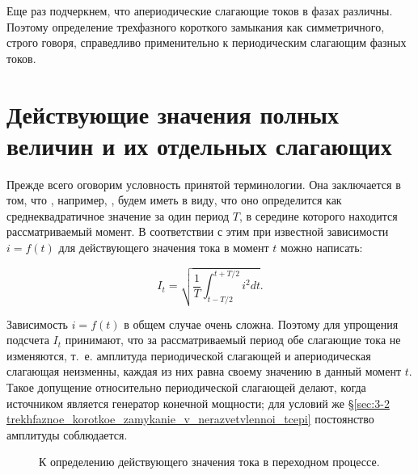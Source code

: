 Еще раз подчеркнем, что апериодические слагающие токов в фазах различны. Поэтому определение трехфазного короткого замыкания как симметричного, строго говоря, справедливо применительно к периодическим слагающим фазных токов.

\section{Действующие значения полных величин и их отдельных слагающих}

Прежде всего оговорим условность принятой терминологии. Она заключается в том, что , например, , будем  иметь в виду, что оно  определится  как среднеквадратичное значение за один период $ T $, в середине которого находится рассматриваемый момент. В соответствии с этим при известной зависимости $ i = f(t) $ для  действующего значения тока в момент $ t $ можно написать:

\begin{equation}
	I_t = \sqrt{ \frac{1}{T} \int_{t-T/2}^{t+T/2} i^2 dt }.
	\label{eq:3-9 I_t}
\end{equation}

Зависимость $ i = f(t) $ в общем случае очень сложна. Поэтому для упрощения подсчета $ I_t $ принимают, что за рассматриваемый период обе слагающие тока не изменяются, т.~е. амплитуда периодической слагающей и апериодическая слагающая неизменны, каждая из них равна своему значению в данный момент $ t $. Такое допущение относительно периодической слагающей делают, когда источником является генератор конечной мощности; для условий же §\ref{sec:3-2 trekhfaznoe_korotkoe_zamykanie_v_nerazvetvlennoi_tcepi} постоянство амплитуды соблюдается.

\begin{figure}
	\caption{К определению действующего значения тока в переходном процессе.}
	\label{ris:3-5}
\end{figure}

